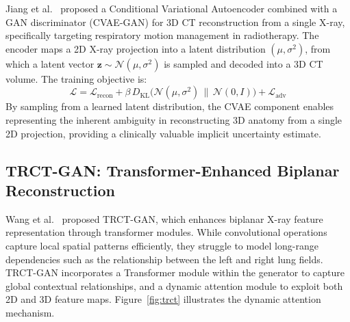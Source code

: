 \documentclass[10pt,twocolumn,a4paper]{article}
\begin{document}
Jiang et al.~\cite{cvaegan} proposed a Conditional Variational Autoencoder
combined with a GAN discriminator (CVAE-GAN) for 3D CT reconstruction from a
single X-ray, specifically targeting respiratory motion management in
radiotherapy. The encoder maps a 2D X-ray projection into a latent distribution
$(\mu, \sigma^2)$, from which a latent vector $\mathbf{z} \sim \mathcal{N}(\mu,
\sigma^2)$ is sampled and decoded into a 3D CT volume. The training objective
is:
\begin{equation}
\mathcal{L} = \mathcal{L}_\text{recon} + \beta\,D_\text{KL}
\!\bigl(\mathcal{N}(\mu,\sigma^2)\,\|\,\mathcal{N}(0,I)\bigr)
+ \mathcal{L}_\text{adv}
\label{eq:cvae}
\end{equation}
By sampling from a learned latent distribution, the CVAE component enables
representing the inherent ambiguity in reconstructing 3D anatomy from a single
2D projection, providing a clinically valuable implicit uncertainty estimate.

\subsection{TRCT-GAN: Transformer-Enhanced Biplanar Reconstruction}
\label{sec:gan:trct}

Wang et al.~\cite{trctgan} proposed TRCT-GAN, which enhances biplanar X-ray
feature representation through transformer modules. While convolutional
operations capture local spatial patterns efficiently, they struggle to model
long-range dependencies such as the relationship between the left and right lung
fields. TRCT-GAN incorporates a Transformer module within the generator to
capture global contextual relationships, and a dynamic attention module to
exploit both 2D and 3D feature maps. Figure~\ref{fig:trct} illustrates the
dynamic attention mechanism.
\end{document}
